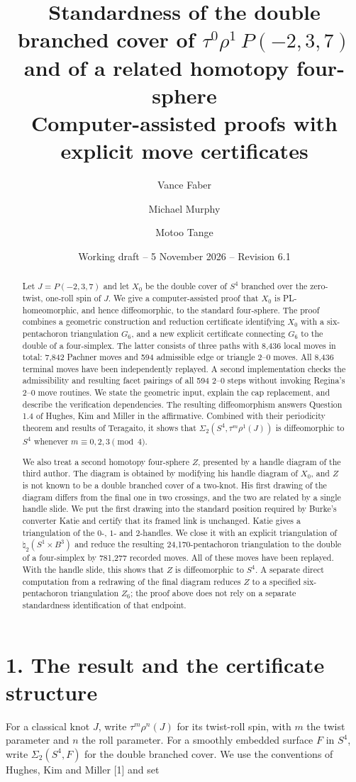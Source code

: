 \documentclass[11pt,letterpaper]{article}
\title{Standardness of the double branched cover of $\tau^0\rho^1\,P(-2,3,7)$\\ and of a related homotopy four-sphere\\[0.4em]\large Computer-assisted proofs with explicit move certificates}
\author{Vance Faber \and Michael Murphy \and Motoo Tange}
\date{Working draft -- 5 November 2026 -- Revision 6.1}
\begin{document}
\maketitle
\begin{abstract}
Let $J=P(-2,3,7)$ and let $X_0$ be the double cover of $S^4$ branched over the zero-twist, one-roll spin of $J$. We give a computer-assisted proof that $X_0$ is PL-homeomorphic, and hence diffeomorphic, to the standard four-sphere. The proof combines a geometric construction and reduction certificate identifying $X_0$ with a six-pentachoron triangulation $G_6$, and a new explicit certificate connecting $G_6$ to the double of a four-simplex. The latter consists of three paths with 8,436 local moves in total: 7,842 Pachner moves and 594 admissible edge or triangle 2--0 moves. All 8,436 terminal moves have been independently replayed. A second implementation checks the admissibility and resulting facet pairings of all 594 2--0 steps without invoking Regina's 2--0 move routines. We state the geometric input, explain the cap replacement, and describe the verification dependencies. The resulting diffeomorphism answers Question 1.4 of Hughes, Kim and Miller in the affirmative. Combined with their periodicity theorem and results of Teragaito, it shows that $\Sigma_2(S^4,\tau^m\rho^1(J))$ is diffeomorphic to $S^4$ whenever $m\equiv0,2,3\pmod4$.

We also treat a second homotopy four-sphere $Z$, presented by a handle diagram of the third author. The diagram is obtained by modifying his handle diagram of $X_0$, and $Z$ is not known to be a double branched cover of a two-knot. His first drawing of the diagram differs from the final one in two crossings, and the two are related by a single handle slide. We put the first drawing into the standard position required by Burke's converter Katie and certify that its framed link is unchanged. Katie gives a triangulation of the $0$-, $1$- and $2$-handles. We close it with an explicit triangulation of $\natural_2(S^1\times B^3)$ and reduce the resulting 24,170-pentachoron triangulation to the double of a four-simplex by 781,277 recorded moves. All of these moves have been replayed. With the handle slide, this shows that $Z$ is diffeomorphic to $S^4$. A separate direct computation from a redrawing of the final diagram reduces $Z$ to a specified six-pentachoron triangulation $Z_6$; the proof above does not rely on a separate standardness identification of that endpoint.
\end{abstract}
\section*{1. The result and the certificate structure}
For a classical knot $J$, write $\tau^m\rho^n(J)$ for its twist-roll spin, with $m$ the twist parameter and $n$ the roll parameter. For a smoothly embedded surface $F$ in $S^4$, write $\Sigma_2(S^4,F)$ for the double branched cover. We use the conventions of Hughes, Kim and Miller [1] and set
\end{document}
